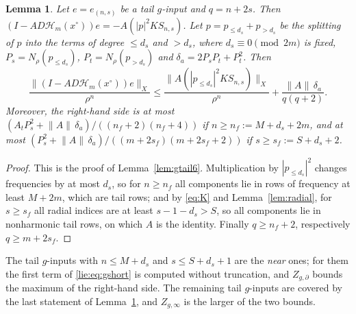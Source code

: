 \documentclass[11pt]{amsart}
\newtheorem{lemma}[theorem]{Lemma}
\theoremstyle{definition}
\theoremstyle{remark}
\numberwithin{equation}{section}
\newcommand{\nrm}[1]{\lVert #1\rVert}
\newcommand{\Hc}{\mathcal{H}}
\begin{document}
\begin{lemma}\label{lie:lem:gtail}
Let $e=e_{(n,s)}$ be a tail $g$-input and $q=n+2s$. Then $(I-AD\Hc_m(x^\circ))e=-A(|p|^2KS_{n,s})$. Let $p=p_{\leq d_s}+p_{>d_s}$ be the splitting of $p$ into the terms of degree $\leq d_s$ and $>d_s$, where $d_s\equiv0\pmod{2m}$ is fixed, $P_s=N_\rho(p_{\leq d_s})$, $P_t=N_\rho(p_{>d_s})$ and $\delta_a=2P_sP_t+P_t^2$. Then
\begin{equation}\label{lie:eq:gshort}
\frac{\nrm{(I-AD\Hc_m(x^\circ))e}_X}{\rho^n}\leq\frac{\nrm{A(|p_{\leq d_s}|^2KS_{n,s})}_X}{\rho^n}+\frac{\nrm A\,\delta_a}{q(q+2)} .
\end{equation}
Moreover, the right-hand side is at most $(A_tP_s^2+\nrm A\,\delta_a)/((n_f+2)(n_f+4))$ if $n\geq n_f:=M+d_s+2m$, and at most $(P_s^2+\nrm A\,\delta_a)/((m+2s_f)(m+2s_f+2))$ if $s\geq s_f:=S+d_s+2$.
\end{lemma}

\begin{proof}
This is the proof of Lemma~\ref{lem:gtail6}. Multiplication by $|p_{\leq d_s}|^2$ changes frequencies by at most $d_s$, so for $n\geq n_f$ all components lie in rows of frequency at least $M+2m$, which are tail rows; and by \eqref{eq:K} and Lemma~\ref{lem:radial}, for $s\geq s_f$ all radial indices are at least $s-1-d_s>S$, so all components lie in nonharmonic tail rows, on which $A$ is the identity. Finally $q\geq n_f+2$, respectively $q\geq m+2s_f$.
\end{proof}

The tail $g$-inputs with $n\leq M+d_s$ and $s\leq S+d_s+1$ are the \emph{near} ones; for them the first term of \eqref{lie:eq:gshort} is computed without truncation, and $Z_{g,\partial}$ bounds the maximum of the right-hand side. The remaining tail $g$-inputs are covered by the last statement of Lemma~\ref{lie:lem:gtail}, and $Z_{g,\infty}$ is the larger of the two bounds.
\end{document}

